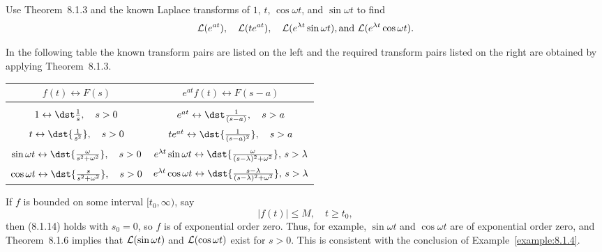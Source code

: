 \setcounter{example}{6}
\begin{example}
  \label{example:8.1.7}\rm Use Theorem~8.1.3 and the known Laplace transforms of $1$,
  $t$, $\cos\omega t$, and $\sin\omega t$ to find
  \[
    {\cal L}(e^{at}),\quad{\cal L}(te^{at}),\quad{\cal L}(e^{\lambda t}\sin \omega t),\mbox{and }{\cal L}(e^{\lambda t}\cos\omega t).
  \]
\end{example}
\begin{examplesolution}
\solution In the following table the known transform pairs are listed on the left and the required
transform pairs listed on the right are obtained by applying Theorem~8.1.3.

\begin{center}
  \begin{tabular}{|c|c|}
    \hline
    $f(t)\leftrightarrow F(s)$                                                   & $e^{at}f(t)\leftrightarrow F(s-a)$                                                                       \\
    \hline
                                                                                 &                                                                                                          \\[9pt]
    $1\leftrightarrow\dst\frac{1}{s},\quad s>0$                                  & $e^{at}\leftrightarrow\dst\frac{1}{(s-a)},\quad s>a$                                                     \\[9pt]
    $t\leftrightarrow\dst{\frac{1}{s^{2}}},\quad s>0$                            & $te^{at}\leftrightarrow\dst{\frac{1}{(s-a)^{2}}},\quad s>a$                                              \\[9pt]
    $\sin\omega t\leftrightarrow\dst{\frac{\omega}{s^{2}+\omega^{2}}},\quad s>0$ & $e^{\lambda t}\sin\omega t\leftrightarrow\dst{\frac{\omega}{(s-\lambda)^{2}+\omega^{2}}},\,s>\lambda$    \\[9pt]
    $\cos\omega t\leftrightarrow\dst{\frac{s}{s^{2}+\omega^{2}}},\quad s>0$      & $e^{\lambda t}\cos\omega t\leftrightarrow\dst{\frac{s-\lambda}{(s-\lambda)^{2}+\omega^{2}}},\,s>\lambda$ \\[9pt]
    \hline
  \end{tabular}
\end{center}
\end{examplesolution}

\setcounter{example}{7}
\begin{example}
  \label{example:8.1.8}\rm If $f$ is bounded on some interval $[t_{0},\infty)$, say
  \[
    |f(t)|\le M,\quad t\ge t_{0},
  \]
  then \textup{(8.1.14)} holds with $s_{0}=0$, so $f$ is of exponential order zero. Thus, for
  example, $\sin\omega t$ and $\cos\omega t$ are of exponential order zero, and
  Theorem~8.1.6 implies that ${\cal L}(\sin\omega t)$ and ${\cal L}(\cos\omega t)$
  exist for $s>0$. This is consistent with the conclusion of Example~\ref{example:8.1.4}.
\end{example}


